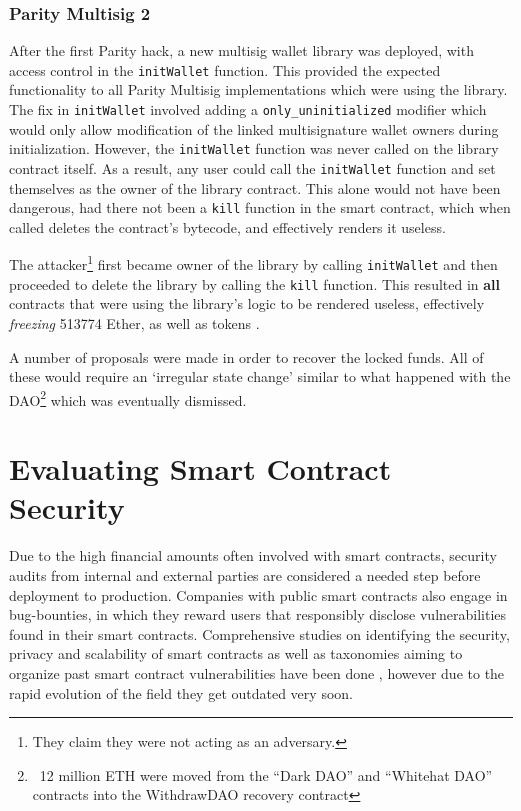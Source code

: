 \subsubsection{Parity Multisig 2}
After the first Parity hack, a new multisig wallet library was deployed, with access control in the \texttt{initWallet} function. This provided the expected functionality to all Parity Multisig implementations which were using the library. The fix in \texttt{initWallet} involved adding a \texttt{only\_uninitialized} modifier which would only allow modification of the linked multisignature wallet owners during initialization. However, the \texttt{initWallet} function was never called on the library contract itself. As a result, any user could call the \texttt{initWallet} function and set themselves as the owner of the library contract. This alone would not have been dangerous, had there not been a \texttt{kill} function in the smart contract, which when called deletes the contract's bytecode, and effectively renders it useless. 

The attacker\footnote{They claim they were not acting as an adversary.} first became owner of the library by calling \texttt{initWallet} and then proceeded to delete the library by calling the \texttt{kill} function. This resulted in \textbf{all} contracts that were using the library's logic to be rendered useless, effectively \textit{freezing} 513774 Ether, as well as tokens \cite{paritypostmortem}. 

A number of proposals were made \cite{eip867} in order to recover the locked funds. All of these would require an `irregular state change' similar to what happened with the DAO\footnote{~12 million ETH were moved from the “Dark DAO” and “Whitehat DAO” contracts into the WithdrawDAO recovery contract\cite{daofork2}} which was eventually dismissed. 

\section{Evaluating Smart Contract Security}
Due to the high financial amounts often involved with smart contracts, security audits from internal and external parties are considered a needed step before deployment to production. Companies with public smart contracts also engage in bug-bounties, in which they reward users that responsibly disclose vulnerabilities found in their smart contracts. Comprehensive studies on identifying the security, privacy and scalability of smart contracts \cite{DBLP:journals/corr/abs-1710-06372} as well as taxonomies aiming to organize past smart contract vulnerabilities have been done \cite{Atzei:2017:SAE:3080353.3080363,tools}, however due to the rapid evolution of the field they get outdated very soon. 

